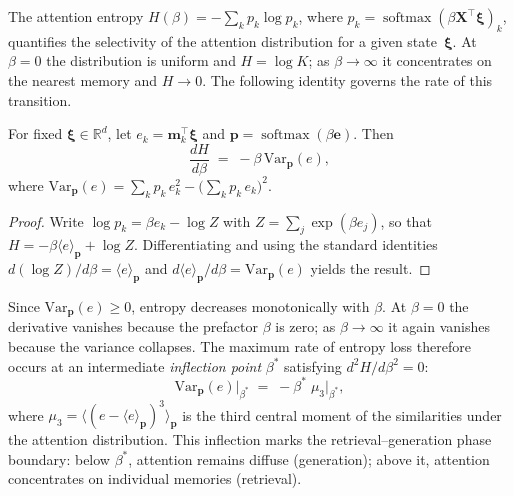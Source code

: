 The attention entropy $H(\beta) = -\sum_k p_k \log p_k$, where $p_k = \operatorname{softmax}(\beta\mathbf{X}^{\top}\boldsymbol{\xi})_k$, quantifies the selectivity of the attention distribution for a given state~$\boldsymbol{\xi}$. At $\beta=0$ the distribution is uniform and $H=\log K$; as $\beta\to\infty$ it concentrates on the nearest memory and $H\to 0$. The following identity governs the rate of this transition.

\begin{proposition}\label{prop:entropy-derivative}
For fixed $\boldsymbol{\xi}\in\mathbb{R}^d$, let $e_k = \mathbf{m}_k^{\top}\boldsymbol{\xi}$ and $\mathbf{p}=\operatorname{softmax}(\beta\mathbf{e})$. Then
\begin{equation}\label{eq:entropy-deriv}
\frac{dH}{d\beta} \;=\; -\beta\,\mathrm{Var}_{\mathbf{p}}(e),
\end{equation}
where $\mathrm{Var}_{\mathbf{p}}(e) = \sum_k p_k\,e_k^2 - \bigl(\sum_k p_k\,e_k\bigr)^{\!2}$.
\end{proposition}

\begin{proof}
Write $\log p_k = \beta e_k - \log Z$ with $Z=\sum_j\exp(\beta e_j)$, so that $H = -\beta\langle e\rangle_{\mathbf{p}} + \log Z$. Differentiating and using the standard identities $d(\log Z)/d\beta = \langle e\rangle_{\mathbf{p}}$ and $d\langle e\rangle_{\mathbf{p}}/d\beta = \mathrm{Var}_{\mathbf{p}}(e)$ yields the result.
\end{proof}

Since $\mathrm{Var}_{\mathbf{p}}(e)\ge 0$, entropy decreases monotonically with $\beta$. At $\beta=0$ the derivative vanishes because the prefactor $\beta$ is zero; as $\beta\to\infty$ it again vanishes because the variance collapses. The maximum rate of entropy loss therefore occurs at an intermediate \emph{inflection point} $\beta^{*}$ satisfying $d^{2}H/d\beta^{2}=0$:
\begin{equation}\label{eq:inflection}
\mathrm{Var}_{\mathbf{p}}(e)\big|_{\beta^{*}} \;=\; -\beta^{*}\;\mu_{3}\big|_{\beta^{*}},
\end{equation}
where $\mu_3 = \langle(e - \langle e\rangle_{\mathbf{p}})^3\rangle_{\mathbf{p}}$ is the third central moment of the similarities under the attention distribution. This inflection marks the retrieval--generation phase boundary: below $\beta^{*}$, attention remains diffuse (generation); above it, attention concentrates on individual memories (retrieval).

